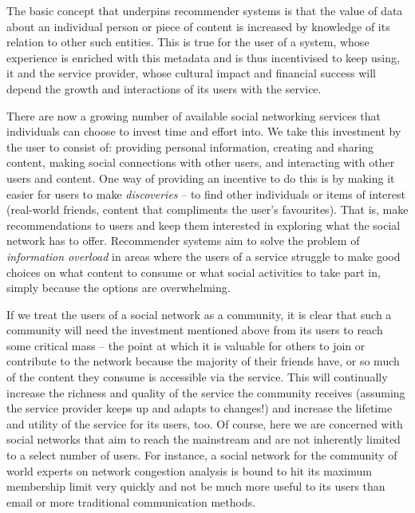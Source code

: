 \documentclass[a4paper,12pt,twoside,notitlepage]{report}
\begin{document}
The basic concept that underpins recommender systems is that the value of data
about an individual person or piece of content is increased by knowledge of its
relation to other such entities. This is true for the user of a system, whose
experience is enriched with this metadata and is thus incentivised to keep
using, it and the service provider, whose cultural impact and financial success
will depend the growth and interactions of its users with the service.

There are now a growing number of available social networking services that
individuals can choose to invest time and effort into. We take this investment
by the user to consist of: providing personal information, creating and sharing
content, making social connections with other users, and interacting with other
users and content. One way of providing an incentive to do this is by making it
easier for users to make \emph{discoveries} -- to find other individuals or
items of interest (real-world friends, content that compliments the user's
favourites). That is, make recommendations to users and keep them interested in
exploring what the social network has to offer. Recommender systems aim
to solve the problem of \emph{information overload} in areas where the users of
a service struggle to make good choices on what content to consume or what
social activities to take part in, simply because the options are overwhelming.

If we treat the users of a social network as a community, it is clear that such
a community will need the investment mentioned above from its users to reach
some critical mass -- the point at which it is valuable for others to join 
or contribute to the network because the majority of their friends have, or so 
much of the content they consume is accessible via the service. This will 
continually increase the richness and quality of the service the community 
receives (assuming the service provider keeps up and adapts to changes!) and 
increase the lifetime and utility of the service for its users, too. Of course, 
here we are concerned with social networks that aim to reach the mainstream and 
are not inherently limited to a select number of users. For instance, a social 
network for the community of world experts on network congestion analysis is 
bound to hit its maximum membership limit very quickly and not be much more 
useful to its users than email or more traditional communication methods.
\end{document}
